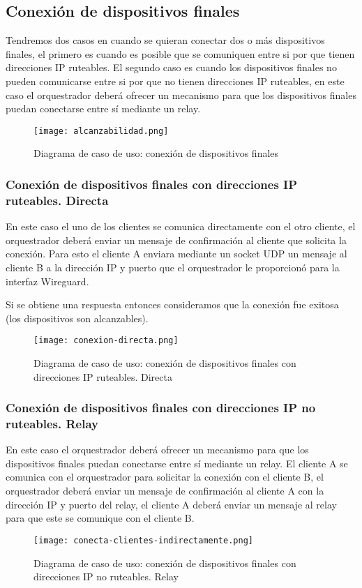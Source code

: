 \subsection{Conexión de dispositivos finales}

Tendremos dos casos en cuando se quieran conectar dos o más dispositivos finales, el primero es cuando es posible que se comuniquen entre si por que tienen direcciones IP ruteables.
El segundo caso es cuando los dispositivos finales no pueden comunicarse entre si por que no tienen direcciones IP ruteables, en este caso el orquestrador deberá ofrecer un mecanismo para que los dispositivos finales puedan conectarse entre sí mediante un relay.
\begin{figure}[h!]
    \centering
    \texttt{[image: alcanzabilidad.png]}
    \caption{Diagrama de caso de uso: conexión de dispositivos finales}
\end{figure}

\subsubsection{Conexión de dispositivos finales con direcciones IP ruteables. Directa}

En este caso el uno de los clientes se comunica directamente con el otro cliente, el orquestrador deberá enviar un mensaje de confirmación al cliente que solicita la conexión. 
Para esto el cliente A enviara mediante un socket UDP un mensaje al cliente B a la dirección IP y puerto que el orquestrador le proporcionó para la interfaz Wireguard.

Si se obtiene una respuesta entonces consideramos que la conexión fue exitosa (los dispositivos son alcanzables). 
\begin{figure}[h!]
    \centering
    \texttt{[image: conexion-directa.png]}
    \caption{Diagrama de caso de uso: conexión de dispositivos finales con direcciones IP ruteables. Directa}
\end{figure}


\subsubsection{Conexión de dispositivos finales con direcciones IP no ruteables. Relay}

En este caso el orquestrador deberá ofrecer un mecanismo para que los dispositivos finales puedan conectarse entre sí mediante un relay. 
El cliente A se comunica con el orquestrador para solicitar la conexión con el cliente B, el orquestrador deberá enviar un mensaje de confirmación al cliente A con la dirección IP y puerto del relay, el cliente A deberá enviar un mensaje al relay para que este se comunique con el cliente B. 

\begin{figure}[h!]
    \centering
    \texttt{[image: conecta-clientes-indirectamente.png]}
    \caption{Diagrama de caso de uso: conexión de dispositivos finales con direcciones IP no ruteables. Relay}
\end{figure}